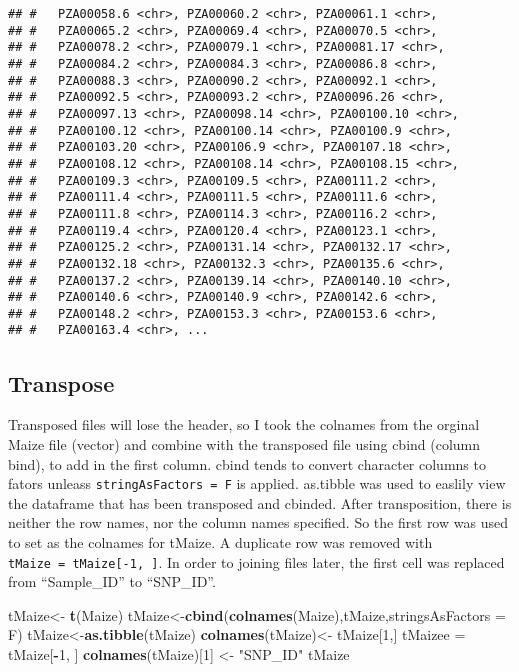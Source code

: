 \documentclass[]{article}
\newenvironment{Shaded}{\begin{snugshade}}{\end{snugshade}}
\newcommand{\KeywordTok}[1]{\textcolor[rgb]{0.13,0.29,0.53}{\textbf{#1}}}
\newcommand{\DataTypeTok}[1]{\textcolor[rgb]{0.13,0.29,0.53}{#1}}
\newcommand{\DecValTok}[1]{\textcolor[rgb]{0.00,0.00,0.81}{#1}}
\newcommand{\StringTok}[1]{\textcolor[rgb]{0.31,0.60,0.02}{#1}}
\newcommand{\OperatorTok}[1]{\textcolor[rgb]{0.81,0.36,0.00}{\textbf{#1}}}
\newcommand{\NormalTok}[1]{#1}
\begin{document}
\begin{verbatim}
## #   PZA00058.6 <chr>, PZA00060.2 <chr>, PZA00061.1 <chr>,
## #   PZA00065.2 <chr>, PZA00069.4 <chr>, PZA00070.5 <chr>,
## #   PZA00078.2 <chr>, PZA00079.1 <chr>, PZA00081.17 <chr>,
## #   PZA00084.2 <chr>, PZA00084.3 <chr>, PZA00086.8 <chr>,
## #   PZA00088.3 <chr>, PZA00090.2 <chr>, PZA00092.1 <chr>,
## #   PZA00092.5 <chr>, PZA00093.2 <chr>, PZA00096.26 <chr>,
## #   PZA00097.13 <chr>, PZA00098.14 <chr>, PZA00100.10 <chr>,
## #   PZA00100.12 <chr>, PZA00100.14 <chr>, PZA00100.9 <chr>,
## #   PZA00103.20 <chr>, PZA00106.9 <chr>, PZA00107.18 <chr>,
## #   PZA00108.12 <chr>, PZA00108.14 <chr>, PZA00108.15 <chr>,
## #   PZA00109.3 <chr>, PZA00109.5 <chr>, PZA00111.2 <chr>,
## #   PZA00111.4 <chr>, PZA00111.5 <chr>, PZA00111.6 <chr>,
## #   PZA00111.8 <chr>, PZA00114.3 <chr>, PZA00116.2 <chr>,
## #   PZA00119.4 <chr>, PZA00120.4 <chr>, PZA00123.1 <chr>,
## #   PZA00125.2 <chr>, PZA00131.14 <chr>, PZA00132.17 <chr>,
## #   PZA00132.18 <chr>, PZA00132.3 <chr>, PZA00135.6 <chr>,
## #   PZA00137.2 <chr>, PZA00139.14 <chr>, PZA00140.10 <chr>,
## #   PZA00140.6 <chr>, PZA00140.9 <chr>, PZA00142.6 <chr>,
## #   PZA00148.2 <chr>, PZA00153.3 <chr>, PZA00153.6 <chr>,
## #   PZA00163.4 <chr>, ...
\end{verbatim}

\subsection{Transpose}\label{transpose}

Transposed files will lose the header, so I took the colnames from the
orginal Maize file (vector) and combine with the transposed file using
cbind (column bind), to add in the first column. cbind tends to convert
character columns to fators unleass \texttt{stringAsFactors\ =\ F} is
applied. as.tibble was used to easlily view the dataframe that has been
transposed and cbinded. After transposition, there is neither the row
names, nor the column names specified. So the first row was used to set
as the colnames for tMaize. A duplicate row was removed with
\texttt{tMaize\ =\ tMaize{[}-1,\ {]}}. In order to joining files later,
the first cell was replaced from ``Sample\_ID'' to ``SNP\_ID''.

\begin{Shaded}
\begin{Highlighting}[]
\NormalTok{tMaize<-}\StringTok{ }\KeywordTok{t}\NormalTok{(Maize)}
\NormalTok{tMaize<-}\KeywordTok{cbind}\NormalTok{(}\KeywordTok{colnames}\NormalTok{(Maize),tMaize,}\DataTypeTok{stringsAsFactors =}\NormalTok{ F)}
\NormalTok{tMaize<-}\KeywordTok{as.tibble}\NormalTok{(tMaize)}
\KeywordTok{colnames}\NormalTok{(tMaize)<-}\StringTok{ }\NormalTok{tMaize[}\DecValTok{1}\NormalTok{,]}
\NormalTok{tMaizee =}\StringTok{ }\NormalTok{tMaize[}\OperatorTok{-}\DecValTok{1}\NormalTok{, ]}
\KeywordTok{colnames}\NormalTok{(tMaize)[}\DecValTok{1}\NormalTok{] <-}\StringTok{ "SNP_ID"}
\NormalTok{tMaize}
\end{Highlighting}
\end{Shaded}
\end{document}
